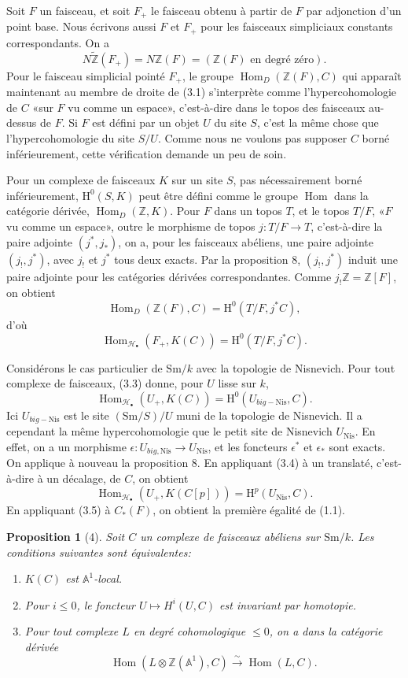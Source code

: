 \documentclass[11pt]{article}
\newcommand{\Aone}{\mathbb A^1}
\newcommand{\Z}{\mathbb Z}
\newcommand{\Nis}{\mathrm{Nis}}
\newcommand{\Sm}{\mathrm{Sm}}
\newcommand{\Hom}{\operatorname{Hom}}
\newcommand{\Hob}{\mathcal H_\bullet}
\newcommand{\ZZ}{\widetilde{\Z}}
\newcommand{\HH}{\mathrm H}
\theoremstyle{deligne}
\newtheorem*{proposition*}{Proposition}
\begin{document}
Soit \(F\) un faisceau, et soit \(F_+\) le faisceau obtenu à partir de \(F\) par adjonction d'un point base. Nous écrivons aussi \(F\) et \(F_+\) pour les faisceaux simpliciaux constants correspondants. On a
\[
  N\ZZ(F_+)=N\Z(F)=(\Z(F)\text{ en degré zéro}).
\]
Pour le faisceau simplicial pointé \(F_+\), le groupe \(\Hom_D(\Z(F),C)\) qui apparaît maintenant au membre de droite de (3.1) s'interprète comme l'hypercohomologie de \(C\) «sur \(F\) vu comme un espace», c'est-à-dire dans le topos des faisceaux au-dessus de \(F\). Si \(F\) est défini par un objet \(U\) du site \(S\), c'est la même chose que l'hypercohomologie du site \(S/U\). Comme nous ne voulons pas supposer \(C\) borné inférieurement, cette vérification demande un peu de soin.

Pour un complexe de faisceaux \(K\) sur un site \(S\), pas nécessairement borné inférieurement, \(\HH^0(S,K)\) peut être défini comme le groupe \(\Hom\) dans la catégorie dérivée, \(\Hom_D(\Z,K)\). Pour \(F\) dans un topos \(T\), et le topos \(T/F\), «\(F\) vu comme un espace», outre le morphisme de topos \(j:T/F\to T\), c'est-à-dire la paire adjointe \((j^*,j_*)\), on a, pour les faisceaux abéliens, une paire adjointe \((j_!,j^*)\), avec \(j_!\) et \(j^*\) tous deux exacts. Par la proposition 8, \((j_!,j^*)\) induit une paire adjointe pour les catégories dérivées correspondantes. Comme \(j_!\Z=\Z[F]\), on obtient
\[
  \Hom_D(\Z(F),C)=\HH^0(T/F,j^*C), \tag{3.2}
\]
d'où
\[
  \Hom_{\Hob}(F_+,K(C))=\HH^0(T/F,j^*C). \tag{3.3}
\]

Considérons le cas particulier de \(\Sm/k\) avec la topologie de Nisnevich. Pour tout complexe de faisceaux, (3.3) donne, pour \(U\) lisse sur \(k\),
\[
  \Hom_{\Hob}(U_+,K(C))=\HH^0(U_{big-\Nis},C). \tag{3.4}
\]
Ici \(U_{big-\Nis}\) est le site \((\Sm/S)/U\) muni de la topologie de Nisnevich. Il a cependant la même hypercohomologie que le petit site de Nisnevich \(U_{\Nis}\). En effet, on a un morphisme \(\epsilon:U_{big,\Nis}\to U_{\Nis}\), et les foncteurs \(\epsilon^*\) et \(\epsilon_*\) sont exacts. On applique à nouveau la proposition 8. En appliquant (3.4) à un translaté, c'est-à-dire à un décalage, de \(C\), on obtient
\[
  \Hom_{\Hob}(U_+,K(C[p]))=\HH^p(U_{\Nis},C). \tag{3.5}
\]
En appliquant (3.5) à \(C_*(F)\), on obtient la première égalité de (1.1).

\begin{proposition*}[4]
Soit \(C\) un complexe de faisceaux abéliens sur \(\Sm/k\). Les conditions suivantes sont équivalentes:
\begin{enumerate}[label=\arabic*.]
\item \(K(C)\) est \(\Aone\)-local.
\item Pour \(i\le0\), le foncteur \(U\mapsto H^i(U,C)\) est invariant par homotopie.
\item Pour tout complexe \(L\) en degré cohomologique \(\le0\), on a dans la catégorie dérivée
\[
  \Hom(L\otimes\Z(\Aone),C)\overset{\sim}{\longrightarrow}\Hom(L,C).
\]
\end{enumerate}
\end{proposition*}
\end{document}
